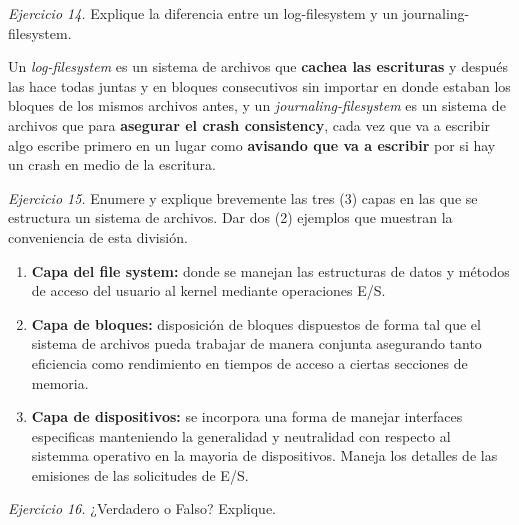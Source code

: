 \documentclass[12pt]{article}
\begin{document}
\noindent \textit{Ejercicio 14.} Explique la diferencia entre un log-filesystem y un journaling-filesystem.

\begin{rta}
    Un \textit{log-filesystem} es un sistema de archivos que \textbf{cachea las escrituras} y después las hace todas juntas y en bloques consecutivos sin importar en donde estaban los bloques de los mismos archivos antes, y un \textit{journaling-filesystem} es un sistema de archivos que para \textbf{asegurar el crash consistency}, cada vez que va a escribir algo escribe primero en un lugar como \textbf{avisando que va a escribir} por si hay un crash en medio de la escritura.
\end{rta}


\noindent \textit{Ejercicio 15.} Enumere y explique brevemente las tres (3) capas en las que se estructura un sistema de archivos. Dar dos (2) ejemplos que muestran la conveniencia de esta división.

\begin{rta}
    \begin{enumerate}
        \item \textbf{Capa del file system:} donde se manejan las estructuras de datos y métodos de acceso del usuario al kernel mediante operaciones E/S.
        \item \textbf{Capa de bloques:} disposición de bloques dispuestos de forma tal que el sistema de archivos pueda trabajar de manera conjunta asegurando tanto eficiencia como rendimiento en tiempos de acceso a ciertas secciones de memoria.
        \item \textbf{Capa de dispositivos:} se incorpora una forma de manejar interfaces especificas manteniendo la generalidad y neutralidad con respecto al sistemma operativo en la mayoria de dispositivos. Maneja los detalles de las emisiones de las solicitudes de E/S.
    \end{enumerate}
\end{rta}

\noindent \textit{Ejercicio 16.} ¿Verdadero o Falso? Explique.
\end{document}
